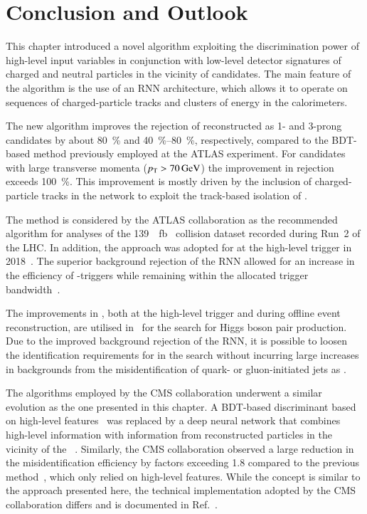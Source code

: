 \section{Conclusion and Outlook}%
\label{sec:tauid_conclusion}

This chapter introduced a novel \tauid algorithm exploiting the discrimination
power of high-level input variables in conjunction with low-level detector
signatures of charged and neutral particles in the vicinity of \tauhadvis
candidates. The main feature of the algorithm is the use of an RNN architecture,
which allows it to operate on sequences of charged-particle tracks and clusters
of energy in the calorimeters.

The new algorithm improves the rejection of \faketauhadvis
reconstructed as 1- and 3-prong \tauhadvis candidates by about
\SI{80}{\percent} and \SIrange{40}{80}{\percent}, respectively,
compared to the BDT-based method previously employed at the ATLAS
experiment. For \tauhadvis candidates with large transverse momenta
($\pT > \SI{70}{\GeV}$) the improvement in \faketauhadvis rejection
exceeds \SI{100}{\percent}. This improvement is mostly driven by the
inclusion of charged-particle tracks in the network to exploit the
track-based isolation of \tauhadvis.

The method is considered by the ATLAS collaboration as the recommended \tauid
algorithm for analyses of the \SI{139}{\per\femto\barn} \pp~collision dataset
recorded during Run~2 of the LHC. In addition, the approach was adopted for
\tauid at the high-level trigger in 2018~\cite{ATL-DAQ-PUB-2019-001}. The
superior background rejection of the RNN \tauid allowed for an increase in the
efficiency of \tauhadvis-triggers while remaining within the allocated trigger
bandwidth~\cite{ATL-DAQ-PUB-2019-001}.

The improvements in \tauid, both at the high-level trigger and during offline
event reconstruction, are utilised in~ for the search for
Higgs boson pair production. Due to the improved background rejection of the
RNN, it is possible to loosen the identification requirements for \tauhadvis in
the search without incurring large increases in backgrounds from the
misidentification of quark- or gluon-initiated jets as \tauhadvis.

The \tauid algorithms employed by the CMS collaboration underwent a similar
evolution as the one presented in this chapter. A BDT-based discriminant based
on high-level features~\cite{CMS-TAU-16-003} was replaced by a deep neural
network that combines high-level information with information from reconstructed
particles in the vicinity of the \tauhadvis~\cite{CMS-TAU-20-001}. Similarly,
the CMS collaboration observed a large reduction in the \faketauhadvis
misidentification efficiency by factors exceeding 1.8 compared to the previous
method~\cite{CMS-TAU-20-001}, which only relied on high-level features. While
the concept is similar to the approach presented here, the technical
implementation adopted by the CMS collaboration differs and is documented in
Ref.~\cite{CMS-TAU-20-001}.

